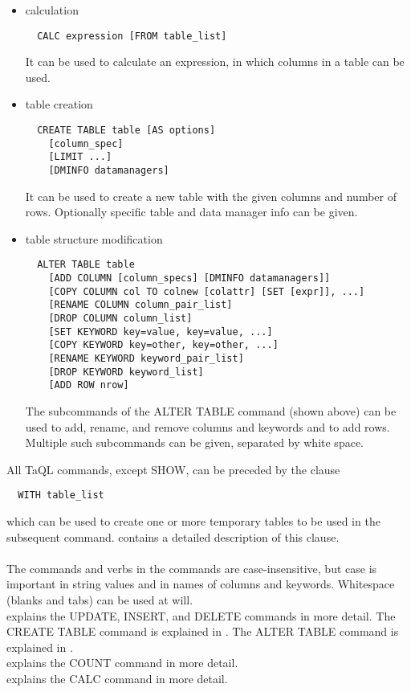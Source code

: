 \begin{itemize}
\item calculation
\begin{verbatim}
  CALC expression [FROM table_list]
\end{verbatim}
It can be used to calculate an expression, in which columns
in a table can be used.

\item table creation
\begin{verbatim}
  CREATE TABLE table [AS options]
    [column_spec]
    [LIMIT ...]
    [DMINFO datamanagers]
\end{verbatim}
It can be used to create a new table with the given columns and number
of rows.
Optionally specific table and data manager info can be given.

\item table structure modification
\begin{verbatim}
  ALTER TABLE table
    [ADD COLUMN [column_specs] [DMINFO datamanagers]]
    [COPY COLUMN col TO colnew [colattr] [SET [expr]], ...]
    [RENAME COLUMN column_pair_list]
    [DROP COLUMN column_list]
    [SET KEYWORD key=value, key=value, ...]
    [COPY KEYWORD key=other, key=other, ...]
    [RENAME KEYWORD keyword_pair_list]
    [DROP KEYWORD keyword_list]
    [ADD ROW nrow]
\end{verbatim}
The subcommands of the ALTER TABLE command (shown above) can be used
to add, rename, and remove columns and keywords and to add rows.
Multiple such subcommands can be given, separated by white space.

\end{itemize}
All TaQL commands, except SHOW, can be preceded by the clause
\begin{verbatim}
  WITH table_list
\end{verbatim}
which can be used to create one or more temporary tables to be used in
the subsequent command. 
contains a detailed description of this clause.
\paragraph*{}
The commands and verbs in the commands are
case-insensitive, but case is important in string values and
in names of columns and keywords. Whitespace (blanks and tabs) can
be used at will.
\\ 
explains the UPDATE, INSERT, and DELETE commands in more detail.
The CREATE TABLE command is
explained in 
.
The ALTER TABLE command is explained in 
.
\\
explains the COUNT command in more detail.
\\
explains the CALC command in more detail.


